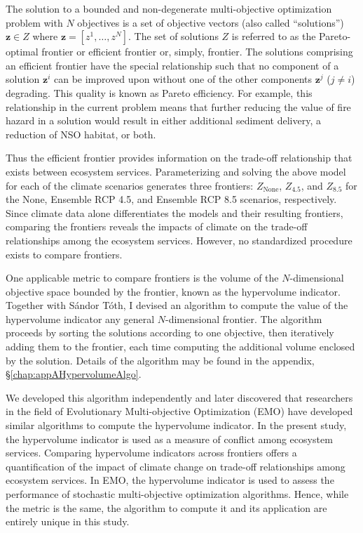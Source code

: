 The solution to a bounded and non-degenerate multi-objective optimization problem with $N$ objectives is a set of objective vectors (also called ``solutions'') $\mathbf{z} \in Z$ where $\mathbf{z}=[z^1,\ldots,z^N]$. The set of solutions $Z$ is referred to as the Pareto-optimal frontier or efficient frontier or, simply, frontier. The solutions comprising an efficient frontier have the special relationship such that no component of a solution $\mathbf{z}^i$ can be improved upon without one of the other components $\mathbf{z}^j$ ($j \neq i$) degrading. This quality is known as Pareto efficiency. For example, this relationship in the current problem means that further reducing the value of fire hazard in a solution would result in either additional sediment delivery, a reduction of NSO habitat, or both.

Thus the efficient frontier provides information on the trade-off relationship that exists between ecosystem services. Parameterizing and solving the above model for each of the climate scenarios generates three frontiers: $Z_{\text{None}}$, $Z_{4.5}$, and $Z_{8.5}$ for the None, Ensemble RCP 4.5, and Ensemble RCP 8.5 scenarios, respectively. Since climate data alone differentiates the models and their resulting frontiers, comparing the frontiers reveals the impacts of climate on the trade-off relationships among the ecosystem services. However, no standardized procedure exists to compare frontiers.

One applicable metric to compare frontiers is the volume of the $N$-dimensional objective space bounded by the frontier, known as the hypervolume indicator. Together with S\'{a}ndor T\'{o}th, I devised an algorithm to compute the value of the hypervolume indicator any general $N$-dimensional frontier. The algorithm proceeds by sorting the solutions according to one objective, then iteratively adding them to the frontier, each time computing the additional volume enclosed by the solution. Details of the algorithm may be found in the appendix, \S \ref{chap:appAHypervolumeAlgo}.

We developed this algorithm independently and later discovered that researchers in the field of Evolutionary Multi-objective Optimization (EMO) have developed similar algorithms to compute the hypervolume indicator. In the present study, the hypervolume indicator is used as a measure of conflict among ecosystem services. Comparing hypervolume indicators across frontiers offers a quantification of the impact of climate change on trade-off relationships among ecosystem services. In EMO, the hypervolume indicator is used to assess the performance of stochastic multi-objective optimization algorithms. Hence, while the metric is the same, the algorithm to compute it and its application are entirely unique in this study.

